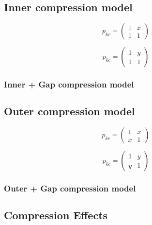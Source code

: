 \documentclass[12pt,a4paper]{IEEEtran}
\begin{document}
\subsection{Inner compression model}

\begin{equation}
p_{kr} = \left (
\begin{array}{cc}
1 & x\\
1 & 1
\end{array} \right )
\end{equation}

\begin{equation}
p_{kc} = \left (
\begin{array}{cc}
1 & y\\
1 & 1
\end{array} \right )
\end{equation}

\subsubsection{Inner + Gap compression model}

\subsection{Outer compression model}

\begin{equation}
p_{kr} = \left (
\begin{array}{cc}
1 & x\\
x & 1
\end{array} \right )
\end{equation}

\begin{equation}
p_{kc} = \left (
\begin{array}{cc}
1 & y\\
y & 1
\end{array} \right )
\end{equation}

\subsubsection{Outer + Gap compression model}


\subsection{Compression Effects\label{sec:CompressionEffect}}
\end{document}

